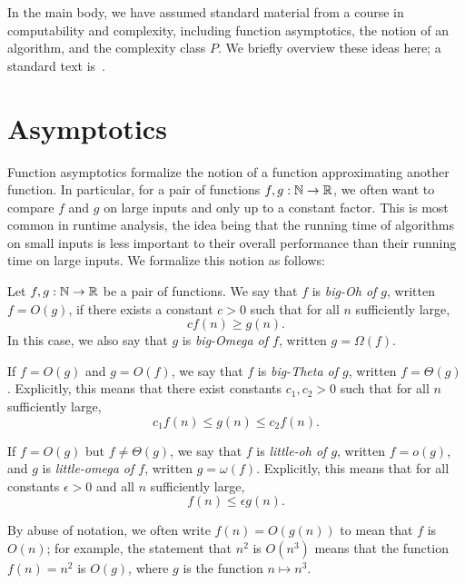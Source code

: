 In the main body, we have assumed standard material from a course in
computability and complexity, including function asymptotics, the notion of an
algorithm, and the complexity class $P$. We briefly overview these ideas here; a
standard text is~\cite{sipser-2013}.

\section{Asymptotics}

Function asymptotics formalize the notion of a function approximating another
function. In particular, for a pair of functions $f,g:\mathbb{N}\to\mathbb{R}$, we often want
to compare $f$ and $g$ on large inputs and only up to a constant factor. This is
most common in runtime analysis, the idea being that the running time of
algorithms on small inputs is less important to their overall performance than
their running time on large inputs. We formalize this notion as follows:

\begin{dfn}
  Let $f,g:\mathbb{N}\to\mathbb{R}$ be a pair of functions. We say that $f$ is \emph{big-Oh of
  $g$}, written $f=O(g)$, if there exists a constant $c>0$ such that for all $n$
  sufficiently large, \[
    c f(n) \geq g(n).
  \] In this case, we also say that $g$ is \emph{big-Omega of $f$}, written $g =
  \Omega(f)$.

  If $f=O(g)$ and $g=O(f)$, we say that $f$ is \emph{big-Theta of $g$}, written
  $f = \Theta(g)$. Explicitly, this means that there exist constants $c_1,c_2>0$
  such that for all $n$ sufficiently large, \[
    c_1 f(n) \leq g(n) \leq c_2 f(n).
  \]

  If $f=O(g)$ but $f\neq\Theta(g)$, we say that $f$ is \emph{little-oh of $g$},
  written $f=o(g)$, and $g$ is \emph{little-omega of $f$}, written $g =
  \omega(f)$. Explicitly, this means that for all constants $\epsilon>0$ and all
  $n$ sufficiently large, \[
    f(n) \leq \epsilon g(n).
  \]
\end{dfn}

\begin{ntn}
  By abuse of notation, we often write $f(n) = O(g(n))$ to mean that $f$ is
  $O(n)$; for example, the statement that $n^2$ is $O(n^3)$ means that the
  function $f(n) = n^2$ is $O(g)$, where $g$ is the function $n\mapsto n^3$.
\end{ntn}

